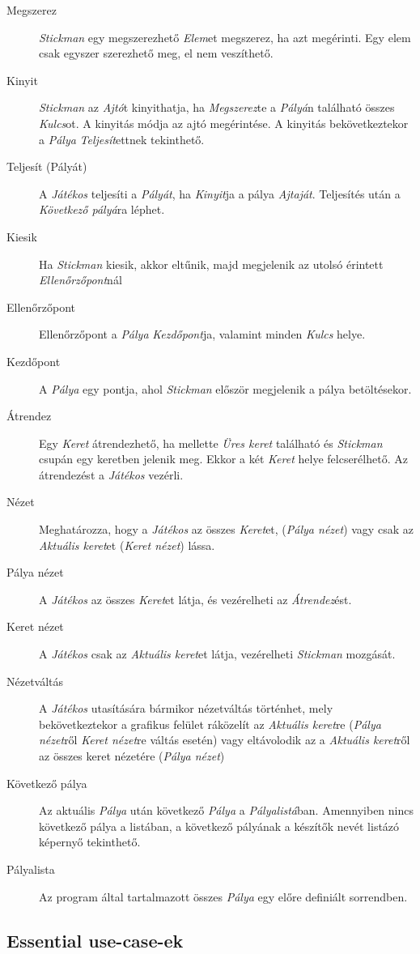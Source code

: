 \begin{description}
    \item[Megszerez] \emph{Stickman} egy megszerezhető \emph{Elem}et megszerez, ha azt megérinti. Egy elem csak egyszer szerezhető meg, el nem veszíthető.
    \item[Kinyit] \emph{Stickman} az \emph{Ajtó}t kinyithatja, ha \emph{Megszerez}te a \emph{Pályá}n található összes \emph{Kulcs}ot. A kinyitás módja az ajtó megérintése. A kinyitás bekövetkeztekor a \emph{Pálya} \emph{Teljesít}ettnek tekinthető.
    \item[Teljesít (Pályát)] A \emph{Játékos} teljesíti a \emph{Pályát}, ha \emph{Kinyit}ja a pálya \emph{Ajtaját}. Teljesítés után a \emph{Következő pályá}ra léphet.
    \item[Kiesik] Ha \emph{Stickman} kiesik, akkor eltűnik, majd megjelenik az utolsó érintett \emph{Ellenőrzőpont}nál
    \item[Ellenőrzőpont] Ellenőrzőpont a \emph{Pálya} \emph{Kezdőpont}ja, valamint minden \emph{Kulcs} helye.
    \item[Kezdőpont] A \emph{Pálya} egy pontja, ahol \emph{Stickman} először megjelenik a pálya betöltésekor.
    \item[Átrendez] Egy \emph{Keret} átrendezhető, ha mellette \emph{Üres keret} található és \emph{Stickman} csupán egy keretben jelenik meg. Ekkor a két \emph{Keret} helye felcserélhető. Az átrendezést a \emph{Játékos} vezérli.
    \item[Nézet] Meghatározza, hogy a \emph{Játékos} az összes \emph{Keret}et, (\emph{Pálya nézet}) vagy csak az \emph{Aktuális keret}et (\emph{Keret nézet}) lássa.
    \item[Pálya nézet] A \emph{Játékos} az összes \emph{Keret}et látja, és vezérelheti az \emph{Átrendez}ést.
    \item[Keret nézet] A \emph{Játékos} csak az \emph{Aktuális keret}et látja, vezérelheti \emph{Stickman} mozgását.
    \item[Nézetváltás] A \emph{Játékos} utasítására bármikor nézetváltás történhet, mely bekövetkeztekor a grafikus felület ráközelít az \emph{Aktuális keret}re (\emph{Pálya nézet}ről \emph{Keret nézet}re váltás esetén) vagy eltávolodik az a \emph{Aktuális keret}ről az összes keret nézetére (\emph{Pálya nézet})
    \item[Következő pálya] Az aktuális \emph{Pálya} után következő \emph{Pálya} a \emph{Pályalistá}ban. Amennyiben nincs következő pálya a listában, a következő pályának a készítők nevét listázó képernyő tekinthető.
    \item[Pályalista] Az program által tartalmazott összes \emph{Pálya} egy előre definiált sorrendben.

\end{description}

\subsection{Essential use-case-ek}


